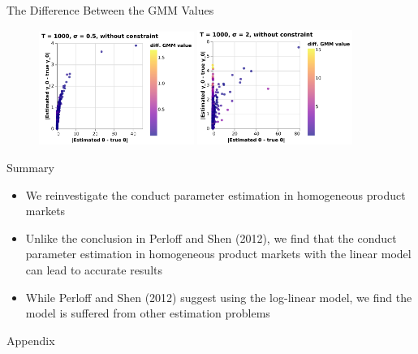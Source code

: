 \documentclass[aspectratio = 169]{beamer}
\theoremstyle{definition}
\begin{document}
\begin{frame}{The Difference Between the GMM Values }
    \begin{figure}[!htbp]
  \begin{center}
  \includegraphics[width = 0.45\textwidth]
  {figuretable/diff_gmm_value_loglinear_loglinear_n_1000_sigma_0.5_non_constraint.pdf}
  \includegraphics[width = 0.45\textwidth]
  {figuretable/diff_gmm_value_loglinear_loglinear_n_1000_sigma_2_non_constraint.pdf}
  \label{fg:diff_gmm_loglinear_loglinear} 
  \end{center}
\end{figure} 
\end{frame}



\begin{frame}{Summary}
    \begin{itemize}
        \item We reinvestigate the conduct parameter estimation in homogeneous product markets
        \item Unlike the conclusion in Perloff and Shen (2012), we find that the conduct parameter estimation in homogeneous product markets with the linear model can lead to accurate results
        \item While Perloff and Shen (2012) suggest using the log-linear model, we find the model is suffered from other estimation problems
    \end{itemize}
\end{frame}


\begin{frame}{}
    \centering
    \large Appendix
\end{frame}
\end{document}
